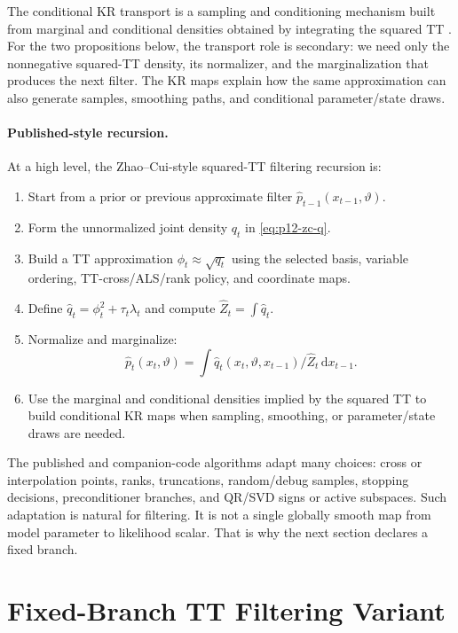 \documentclass[11pt]{article}
\newcommand{\dd}{\mathrm{d}}
\theoremstyle{definition}
\theoremstyle{remark}
\begin{document}
The conditional KR transport is a sampling and conditioning mechanism built
from marginal and conditional densities obtained by integrating the squared TT
\cite{zhao-cui-2024,cui-dolgov-2022}.  For the two propositions below, the
transport role is secondary: we need only the nonnegative squared-TT density,
its normalizer, and the marginalization that produces the next filter.  The KR
maps explain how the same approximation can also generate samples, smoothing
paths, and conditional parameter/state draws.

\paragraph{Published-style recursion.}
At a high level, the Zhao--Cui-style squared-TT filtering recursion is:
\begin{enumerate}[leftmargin=*]
\item Start from a prior or previous approximate filter
  \(\widehat p_{t-1}(x_{t-1},\vartheta)\).
\item Form the unnormalized joint density \(q_t\) in
  \eqref{eq:p12-zc-q}.
\item Build a TT approximation \(\phi_t\approx\sqrt{q_t}\) using the selected
  basis, variable ordering, TT-cross/ALS/rank policy, and coordinate maps.
\item Define \(\widehat q_t=\phi_t^2+\tau_t\lambda_t\) and compute
  \(\widehat Z_t=\int\widehat q_t\).
\item Normalize and marginalize:
  \[
    \widehat p_t(x_t,\vartheta)
    =
    \int
    \widehat q_t(x_t,\vartheta,x_{t-1})/\widehat Z_t
    \,\dd x_{t-1}.
  \]
\item Use the marginal and conditional densities implied by the squared TT to
  build conditional KR maps when sampling, smoothing, or parameter/state draws
  are needed.
\end{enumerate}

The published and companion-code algorithms adapt many choices: cross or
interpolation points, ranks, truncations, random/debug samples, stopping
decisions, preconditioner branches, and QR/SVD signs or active subspaces.  Such
adaptation is natural for filtering.  It is not a single globally smooth map
from model parameter to likelihood scalar.  That is why the next section
declares a fixed branch.

\section{Fixed-Branch TT Filtering Variant}
\end{document}
